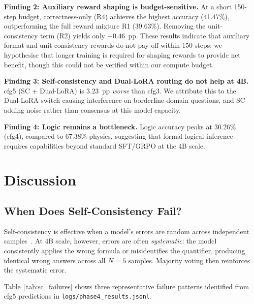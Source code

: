 \documentclass{ieeeaccess}
\begin{document}
\textbf{Finding 2: Auxiliary reward shaping is budget-sensitive.}
At a short 150-step budget, correctness-only (R4) achieves the highest
accuracy (41.47\%), outperforming the full reward mixture R1 (39.63\%).
Removing the unit-consistency term (R2) yields only $-0.46$~pp.
These results indicate that auxiliary format and unit-consistency rewards
do not pay off within 150 steps; we hypothesise that longer training is
required for shaping rewards to provide net benefit, though this could
not be verified within our compute budget.

\textbf{Finding 3: Self-consistency and Dual-LoRA routing do not help at 4B.}
cfg5 (SC + Dual-LoRA) is $3.23$~pp \emph{worse} than cfg3.
We attribute this to the Dual-LoRA switch causing interference on
borderline-domain questions, and SC adding noise rather than consensus
at this model capacity.

\textbf{Finding 4: Logic remains a bottleneck.}
Logic accuracy peaks at $30.26\%$ (cfg4), compared to $67.38\%$ physics,
suggesting that formal logical inference requires capabilities beyond
standard SFT/GRPO at the 4B scale.

\section{Discussion}
\label{sec:discussion}

\subsection{When Does Self-Consistency Fail?}

Self-consistency is effective when a model's errors are random across
independent samples~\cite{Wang2023sc}. At 4B scale, however, errors are
often \emph{systematic}: the model consistently applies the wrong formula
or misidentifies the quantifier, producing identical wrong answers across all
$N=5$ samples. Majority voting then reinforces the systematic error.

Table~\ref{tab:sc_failures} shows three representative failure patterns
identified from cfg5 predictions in \texttt{logs/phase4\_results.jsonl}.
\end{document}
